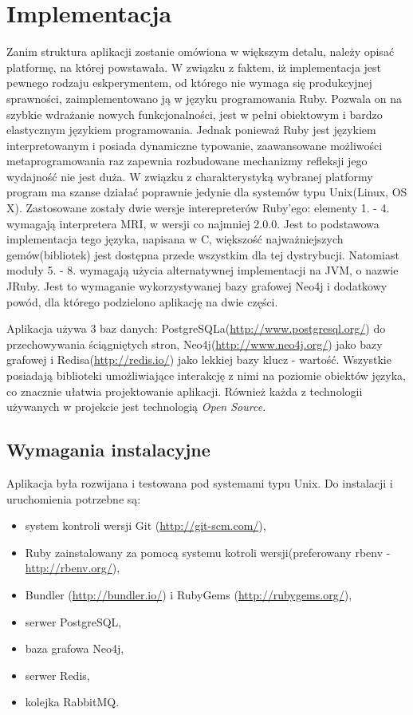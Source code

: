 \chapter{Implementacja}
\label{cha:implementacja}

Zanim struktura aplikacji zostanie omówiona w większym detalu, należy opisać platformę, na której powstawała. W związku z faktem, iż implementacja jest pewnego rodzaju eskperymentem, 
od którego nie wymaga się produkcyjnej sprawności, zaimplementowano ją w języku programowania Ruby. Pozwala on na szybkie wdrażanie nowych funkcjonalności, jest w pełni obiektowym i
bardzo elastycznym językiem programowania. Jednak ponieważ Ruby jest językiem interpretowanym i posiada dynamiczne typowanie, zaawansowane możliwości metaprogramowania raz
zapewnia rozbudowane mechanizmy refleksji jego wydajność nie jest duża.
W związku z charakterystyką wybranej platformy program ma szanse działać poprawnie jedynie dla systemów typu Unix(Linux, OS X). Zastosowane zostały dwie wersje interepreterów Ruby'ego:
elementy 1. - 4. wymagają interpretera MRI, w wersji co najmniej 2.0.0. Jest to podstawowa implementacja tego języka, napisana w C, większość najważniejszych gemów(bibliotek) jest dostępna 
przede wszystkim dla tej dystrybucji. Natomiast moduły 5. - 8. wymagają użycia alternatywnej implementacji na JVM, o nazwie JRuby. Jest to wymaganie wykorzystywanej bazy grafowej Neo4j i dodatkowy powód,
dla którego podzielono aplikację na dwie części.

Aplikacja używa 3 baz danych: PostgreSQLa(\url{http://www.postgresql.org/}) do przechowywania ściągniętych stron, Neo4j(\url{http://www.neo4j.org/}) jako bazy grafowej i Redisa(\url{http://redis.io/})
 jako lekkiej bazy klucz - wartość. Wszystkie posiadają biblioteki umożliwiające interakcję z nimi na poziomie obiektów języka, co znacznie ułatwia projektowanie aplikacji. Również każda
 z technologii używanych w projekcie jest technologią \emph{Open Source}.

\section{Wymagania instalacyjne}
\label{sec:wymaganiaInst}

Aplikacja była rozwijana i testowana pod systemami typu Unix. Do instalacji i uruchomienia potrzebne są:
\begin{itemize}
\item system kontroli wersji Git (\url{http://git-scm.com/}),
\item Ruby zainstalowany za pomocą systemu kotroli wersji(preferowany rbenv - \url{http://rbenv.org/}),
\item Bundler (\url{http://bundler.io/}) i RubyGems (\url{http://rubygems.org/}),
\item serwer PostgreSQL,
\item baza grafowa Neo4j,
\item serwer Redis,
\item kolejka RabbitMQ.
\end{itemize}

